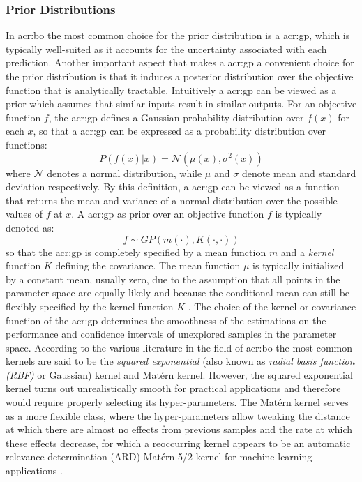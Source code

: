 \subsubsection*{Prior Distributions}
\label{sec:bayesian-optimization-prior}
In \acrlong{acr:bo} the most common choice for the prior distribution is a \acrfull{acr:gp}, which is typically well-suited as it accounts for the uncertainty associated with each prediction.
Another important aspect that makes a \acrshort{acr:gp} a convenient choice for the prior distribution is that it induces a posterior distribution over the objective function that is analytically tractable.
Intuitively a \acrshort{acr:gp} can be viewed as a prior which assumes that similar inputs result in similar outputs.
For an objective function $f$, the \acrshort{acr:gp} defines a Gaussian probability distribution over $f(x)$ for each $x$, so that a \acrshort{acr:gp} can be expressed as a probability distribution over functions:
\begin{equation}
	P(f(x) \vert x) = \mathcal{N}(\mu(x), \sigma^2(x))
\end{equation}
where $\mathcal{N}$ denotes a normal distribution, while $\mu$ and $\sigma$ denote mean and standard deviation respectively.
By this definition, a \acrshort{acr:gp} can be viewed as a function that returns the mean and variance of a normal distribution over the possible values of $f$ at $x$. A \acrshort{acr:gp} as prior over an objective function $f$ is typically denoted as: 
\begin{equation}
\label{eq:gp}
f \sim GP(m(\cdot), K(\cdot, \cdot))
\end{equation}
so that the \acrshort{acr:gp} is completely specified by a mean function $m$ and a \textit{kernel} function $K$ defining the covariance.
The mean function $\mu$ is typically initialized by a constant mean, usually zero, due to the assumption that all points in the parameter space are equally likely and because the conditional mean can still be flexibly specified by the kernel function $K$ \cite{kawaguchi2015bayesian}.
\newpage
The choice of the kernel or covariance function of the \acrshort{acr:gp} determines the smoothness of the estimations on the performance and confidence intervals of unexplored samples in the parameter space.
According to the various literature in the field of \acrlong{acr:bo} the most common kernels are said to be the \textit{squared exponential} (also known as \textit{radial basis function (RBF)} or Gaussian) kernel and Mat\'ern kernel.
However, the squared exponential kernel turns out unrealistically smooth for practical applications \cite{snoek2012practical} and therefore would require properly selecting its hyper-parameters.
The Mat\'ern kernel serves as a more flexible class, where the hyper-parameters allow tweaking the distance at which there are almost no effects from previous samples and the rate at which these effects decrease, for which a reoccurring kernel appears to be an automatic relevance determination (ARD) Mat\'ern 5/2 kernel for machine learning applications \cite{snoek2012practical, kawaguchi2015bayesian}.



